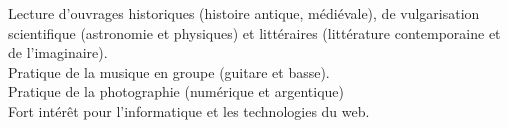 

\begin{cvparagraph}

Lecture d’ouvrages historiques (histoire antique, médiévale), de vulgarisation scientifique (astronomie et physiques) et littéraires (littérature contemporaine et de l’imaginaire). \\
Pratique de la musique en groupe (guitare et basse). \\
Pratique de la photographie (numérique et argentique) \\
Fort intérêt pour l’informatique et les technologies du web.
\end{cvparagraph}
